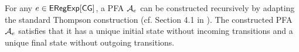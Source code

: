 
For any $e \in {\sf ERegExp}[\sf CG]$, a PFA $\mathcal{A}_e$ can be constructed recursively by adapting the standard
Thompson construction (cf. Section 4.1 in \cite{Thompson68}). The constructed PFA $\mathcal{A}_e$ satisfies that it has a unique initial state without incoming transitions and a unique final state  without outgoing transitions.
%
